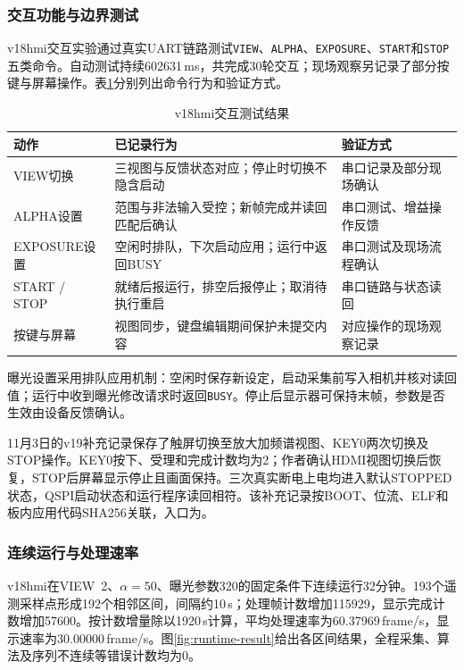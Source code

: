 \subsubsection{交互功能与边界测试}
\label{sec:interaction}
v18hmi交互实验通过真实UART链路测试\texttt{VIEW}、\texttt{ALPHA}、\texttt{EXPOSURE}、\texttt{START}和\texttt{STOP}五类命令。自动测试持续602631\,ms，共完成30轮交互；现场观察另记录了部分按键与屏幕操作。表\ref{tab:interaction-results}分别列出命令行为和验证方式。

\begin{table}[htbp]
\centering\small
\caption{v18hmi交互测试结果}\label{tab:interaction-results}
\begin{tabularx}{\linewidth}{@{}p{2.2cm}X p{3.1cm}@{}}
\toprule
动作 & 已记录行为 & 验证方式 \\
\midrule
VIEW切换 & 三视图与反馈状态对应；停止时切换不隐含启动 & 串口记录及部分现场确认 \\
ALPHA设置 & 范围与非法输入受控；新帧完成并读回匹配后确认 & 串口测试、增益操作反馈 \\
EXPOSURE设置 & 空闲时排队，下次启动应用；运行中返回BUSY & 串口测试及现场流程确认 \\
START / STOP & 就绪后报运行，排空后报停止；取消待执行重启 & 串口链路与状态读回 \\
按键与屏幕 & 视图同步，键盘编辑期间保护未提交内容 & 对应操作的现场观察记录 \\
\bottomrule
\end{tabularx}
\end{table}

曝光设置采用排队应用机制：空闲时保存新设定，启动采集前写入相机并核对读回值；运行中收到曝光修改请求时返回\texttt{BUSY}。停止后显示器可保持末帧，参数是否生效由设备反馈确认。

11月3日的v19补充记录保存了触屏切换至放大加频谱视图、KEY0两次切换及STOP操作。KEY0按下、受理和完成计数均为2；作者确认HDMI视图切换后恢复，STOP后屏幕显示停止且画面保持。三次真实断电上电均进入默认STOPPED状态，QSPI启动状态和运行程序读回相符。该补充记录按BOOT、位流、ELF和板内应用代码SHA256关联，入口为。

\subsubsection{连续运行与处理速率}
v18hmi在VIEW~2、$\alpha=50$、曝光参数320的固定条件下连续运行32分钟。193个遥测采样点形成192个相邻区间，间隔约10\,s；处理帧计数增加115929，显示完成计数增加57600。按计数增量除以1920\,s计算，平均处理速率为60.37969\,frame/s，显示速率为30.00000\,frame/s。图\ref{fig:runtime-result}给出各区间结果，全程采集、算法及序列不连续等错误计数均为0。

